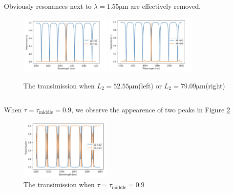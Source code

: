 \documentclass[fontsize=11pt]{scrartcl}
\begin{document}
Obviously resonances next to $\lambda=1.55\mathrm{\mu m}$ are effectively
removed.
\begin{figure}[H]
    \centering
    \includegraphics[width=0.4\textwidth]{img/fig3.1a.png}
    \hspace{0.2cm}
    \includegraphics[width=0.4\textwidth]{img/fig3.1b.png}
    \caption{The transimission when $L_2=52.55 \mathrm{\mu m}$(left) 
    or $L_2=79.09 \mathrm{\mu m}$(right)}
    \label{fig3.1}
\end{figure}

\subsection{}
When $\tau = \tau_{\mathrm{middle}}=0.9$, we observe the appearence of 
two peaks in Figure \ref{fig3.2}
\begin{figure}[H]
    \centering
    \includegraphics[width=0.4\textwidth]{img/fig3.2.png}
    \caption{The transimission when $\tau = \tau_{\mathrm{middle}}=0.9$}
    \label{fig3.2}
\end{figure}
\end{document}
